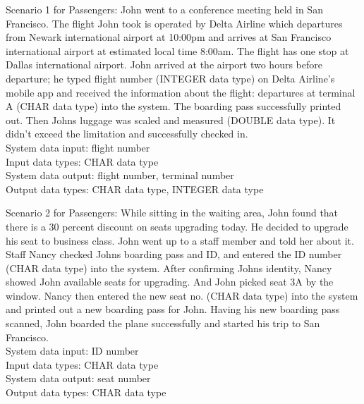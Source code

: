 \documentclass[10pt,conference]{IEEEtran}
\begin{document}
Scenario 1 for Passengers:
John went to a conference meeting held in San Francisco. The flight John took is operated by Delta Airline which departures from Newark international airport at 10:00pm and arrives at San Francisco international airport at estimated local time 8:00am. The flight has one stop at Dallas international airport. John arrived at the airport two hours before departure; he typed flight number (INTEGER data type) on Delta Airline's mobile app and received the information about the flight: departures at terminal A (CHAR data type) into the system. The boarding pass successfully printed out. Then Johns luggage was scaled and measured (DOUBLE data type). It didn't exceed the limitation and successfully checked in.\vspace{5mm}\\System data input: flight number\\
Input data types: CHAR data type\\
System data output: flight number, terminal number\\
Output data types: CHAR data type, INTEGER data type

\vspace{5mm}
Scenario 2 for Passengers:
While sitting in the waiting area, John found that there is a 30 percent discount on seats upgrading today. He decided to upgrade his seat to business class. John went up to a staff member and told her about it. Staff Nancy checked Johns boarding pass and ID, and entered the ID number (CHAR data type) into the system. After confirming Johns identity, Nancy showed John available seats for upgrading. And John picked seat 3A by the window. Nancy then entered the new seat no. (CHAR data type) into the system and printed out a new boarding pass for John. Having his new boarding pass scanned, John boarded the plane successfully and started his trip to San Francisco. \vspace{5mm}\\System data input: ID number
\\
Input data types: CHAR data type\\
System data output: seat number\\
Output data types: CHAR data type
\end{document}

